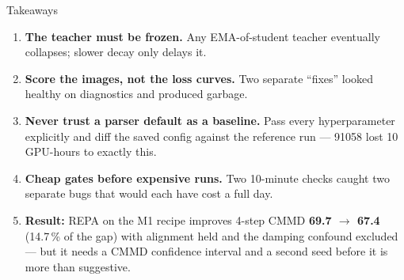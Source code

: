 \documentclass[10pt,aspectratio=169]{beamer}
\newcommand{\good}[1]{\textcolor{good}{\textbf{#1}}}
\begin{document}
\begin{frame}{Takeaways}
  \begin{enumerate}
    \item \textbf{The teacher must be frozen.} Any EMA-of-student teacher eventually
          collapses; slower decay only delays it.
    \item \textbf{Score the images, not the loss curves.} Two separate ``fixes'' looked
          healthy on diagnostics and produced garbage.
    \item \textbf{Never trust a parser default as a baseline.} Pass every hyperparameter
          explicitly and diff the saved config against the reference run --- 91058 lost
          10 GPU-hours to exactly this.
    \item \textbf{Cheap gates before expensive runs.} Two 10-minute checks caught two
          separate bugs that would each have cost a full day.
    \item \textbf{Result:} REPA on the M1 recipe improves 4-step CMMD
          \good{69.7 $\rightarrow$ 67.4} (14.7\,\% of the gap) with alignment held and the
          damping confound excluded --- but it needs a CMMD confidence interval and a
          second seed before it is more than suggestive.
  \end{enumerate}
\end{frame}
\end{document}
